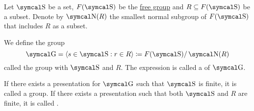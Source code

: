 \begin{definition}\label{def:group_presentation}
  Let \( \CS \) be a set, \( F(\CS) \) be the \hyperref[def:free_group]{free group} and \( R \subseteq F(\CS) \) be a subset. Denote by \( \CN(R) \) the smallest normal subgroup of \( F(\CS) \) that includes \( R \) as a subset.

  We define the group
  \begin{equation}\label{def:group_presentation/presentation}
    \CG = \Gen{s \in \CS : r \in R} \coloneqq F(\CS) / \CN(R)
  \end{equation}
  called the group with  \( \CS \) and  \( R \). The expression  is called a  of \( \CG \).

  If there exists a presentation for \( \CG \) such that \( \CS \) is finite, it is called a  group. If there exists a presentation such that both \( \CS \) and \( R \) are finite, it is called .
\end{definition}

